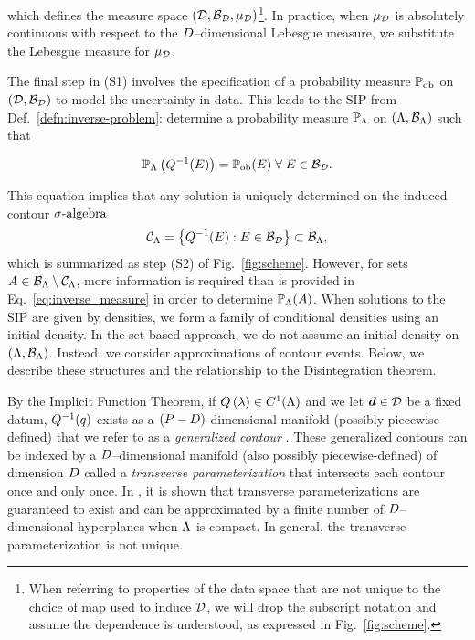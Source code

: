 \noindent which defines the measure space $(\mathcal{D}, \mathcal{B}_{\mathcal{D}}, \mu_{\mathcal{D}})$\footnote{When referring to properties of the data space that are not unique to the choice of map used to induce $\mathcal{D}$, we will drop the subscript notation and assume the dependence is understood, as expressed in Fig.~\ref{fig:scheme}.}.
In practice, when $\mu_{\mathcal{D}}$ is absolutely continuous with respect to the $D$--dimensional Lebesgue measure, we substitute the Lebesgue measure for $\mu_{\mathcal{D}}$.

The final step in (S1) involves the specification of a probability measure $\operatorname*{\mathbb{P}_{ob}}$ on ${(\mathcal{D}, \mathcal{B}_{\mathcal{D}})}$ to model the uncertainty in data.
This leads to the SIP from Def.~\eqref{defn:inverse-problem}: determine a probability measure $\mathbb{P}_{\Lambda}$ on ${({\Lambda}, \mathcal{B}_{{\Lambda}})}$ such that

\begin{equation}\label{eq:inverse_measure}
\mathbb{P}_{\Lambda} \left ( Q^{-1}(E)\right ) = \operatorname*{\mathbb{P}_{ob}}(E) \; \forall \; E \in \mathcal{B}_{\mathcal{D}}.
\end{equation}

\noindent This equation implies that any solution is uniquely determined on the induced contour $\sigma\text{-algebra}$
\begin{equation}\label{eq:contour_sa}
\mathcal{C}_{{\Lambda}} = \left\{Q^{-1}(E) : E \in \mathcal{B}_{\mathcal{D}} \right\} \subset \mathcal{B}_{{\Lambda}},
\end{equation}
which is summarized as step (S2) of Fig.~\ref{fig:scheme}.
However, for sets $A \in \mathcal{B}_{{\Lambda}} \setminus \mathcal{C}_{{\Lambda}}$, more information is required than is provided in Eq.~\eqref{eq:inverse_measure} in order to determine $\mathbb{P}_{\Lambda} (A)$.
When solutions to the SIP are given by densities, we form a family of conditional densities using an initial density.
In the set-based approach, we do not assume an initial density on $({\Lambda}, \mathcal{B}_{{\Lambda}})$.
Instead, we consider approximations of contour events.
Below, we describe these structures and the relationship to the Disintegration theorem.

By the Implicit Function Theorem, if $Q\left ( \lambda \right ) \in C^1 ({\Lambda})$ and we let $\operatorname*{\boldsymbol{d}}\in\mathcal{D}$ be a fixed datum, $Q^{-1}(q)$ exists as a $(P-D)$\--dimensional manifold (possibly piecewise-defined) that we refer to as a \emph{generalized contour} \cite{BET+14}.
These generalized contours can be indexed by a $D$--dimensional manifold (also possibly piecewise-defined) of dimension $D$ called a \emph{transverse parameterization} that intersects each contour once and only once.
In \cite{BET+14}, it is shown that transverse parameterizations are guaranteed to exist and can be approximated by a finite number of $D$--dimensional hyperplanes when ${\Lambda}$ is compact.
In general, the transverse parameterization is not unique.

